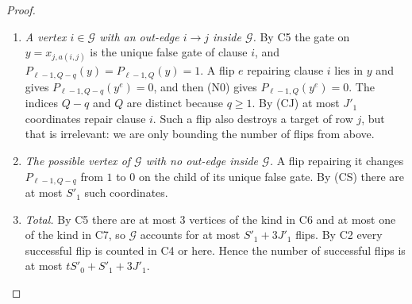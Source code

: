 \documentclass[11pt]{article}
\theoremstyle{definition}
\theoremstyle{remark}
\begin{document}
\begin{proof}
\begin{enumerate}[label=\textbf{C\arabic*.},leftmargin=*]
\[
 \frac{\gamma(\gamma-1)}2\leq \gamma,
 \qquad\text{hence}\qquad \gamma\leq3.
\]
At most one vertex of \(\mathcal G\) has outdegree \(0\) inside \(\mathcal G\), since the edge between any two vertices leaves one of them.
\item \emph{A vertex \(i\in\mathcal G\) with an out-edge \(i\to j\) inside \(\mathcal G\).} By C5 the gate on \(y=x_{j,a(i,j)}\) is the unique false gate of clause \(i\), and \(P_{\ell-1,Q-q}(y)=P_{\ell-1,Q}(y)=1\). A flip \(e\) repairing clause \(i\) lies in \(y\) and gives \(P_{\ell-1,Q-q}(y^e)=0\), and then (N0) gives \(P_{\ell-1,Q}(y^e)=0\). The indices \(Q-q\) and \(Q\) are distinct because \(q\ge1\). By (CJ) at most \(J'_1\) coordinates repair clause \(i\). Such a flip also destroys a target of row \(j\), but that is irrelevant: we are only bounding the number of flips from above.
\item \emph{The possible vertex of \(\mathcal G\) with no out-edge inside \(\mathcal G\).} A flip repairing it changes \(P_{\ell-1,Q-q}\) from \(1\) to \(0\) on the child of its unique false gate. By (CS) there are at most \(S'_1\) such coordinates.
\item \emph{Total.} By C5 there are at most \(3\) vertices of the kind in C6 and at most one of the kind in C7, so \(\mathcal G\) accounts for at most \(S'_1+3J'_1\) flips. By C2 every successful flip is counted in C4 or here. Hence the number of successful flips is at most \(tS'_0+S'_1+3J'_1\).
\end{enumerate}


\end{proof}
\end{document}
